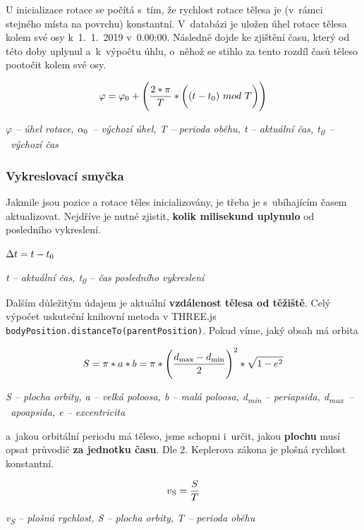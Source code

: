 \documentclass[a4paper,12pt]{article}
\def\code#1{\texttt{#1}}
\begin{document}
U inicializace rotace se počítá s~tím, že rychlost rotace tělesa je (v~rámci stejného místa na povrchu) konstantní. V~databázi je uložen úhel rotace tělesa kolem své osy k~1.~1.~2019 v~0.00:00. Následně dojde ke zjištění času, který od této doby uplynul a~k~výpočtu úhlu, o~něhož se stihlo za tento rozdíl časů těleso pootočit kolem své osy.

\vspace*{-0.5cm}
$$\varphi = \varphi\textsubscript{0} + \Bigg(\frac{2 * \pi}{T} * \bigg((t - t\textsubscript{0})~mod~T\bigg)\Bigg)$$
\begin{center}
\textit{$\varphi$ -- úhel rotace, $\alpha\textsubscript{0}$ -- výchozí úhel, T -- perioda oběhu, t -- aktuální čas, t\textsubscript{0}~--~výchozí čas}
\end{center}

\subsubsection{Vykreslovací smyčka}

Jakmile jsou pozice a rotace těles inicializovány, je třeba je s~ubíhajícím časem aktualizovat. Nejdříve je nutné zjistit, \textbf{kolik milisekund uplynulo} od posledního vykreslení.

\begin{center}
$\Delta t = t - t\textsubscript{0}$

\textit{t -- aktuální čas, t\textsubscript{0} -- čas posledního vykreslení}
\end{center}

Dalším důležitým údajem je aktuální \textbf{vzdálenost tělesa od těžiště}. Celý výpočet uskuteční knihovní metoda v THREE.js \code{bodyPosition.distanceTo(parentPosition)}. Pokud víme, jaký obsah má orbita

\vspace*{-0.5cm}
$$S = \pi * a * b = \pi * \Bigg(\frac{d\textsubscript{max} - d\textsubscript{min}}{2}\Bigg)^2 * \sqrt{1 - e^2}$$
\begin{center}
\textit{S -- plocha orbity, a -- velká poloosa, b -- malá poloosa, d\textsubscript{min} -- periapsida, d\textsubscript{max}~--~apoapsida, e -- excentricita}~\cite{kleczek}
\end{center}

 a~jakou orbitální periodu má těleso, jsme schopni i~určit, jakou \textbf{plochu} musí opsat průvodič \textbf{za jednotku času}. Dle 2. Keplerova zákona je plošná rychlost konstantní.~\cite{kleczek}

\vspace*{-0.5cm}
$$v\textsubscript{S} = \frac{S}{T}$$
\begin{center}
\textit{v\textsubscript{S} -- plošná rychlost, S -- plocha orbity, T -- perioda oběhu}
\end{center}
\end{document}
